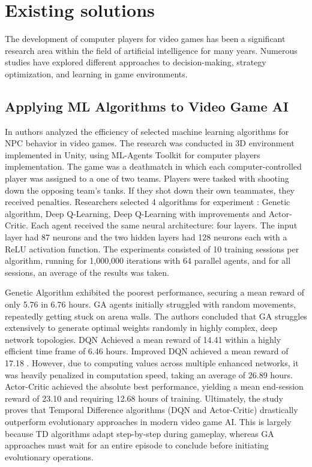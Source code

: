 \section{Existing solutions}
The development of computer players for video games has been a significant research area within the field of artificial intelligence for many years. Numerous studies have explored different approaches to decision-making, strategy optimization, and learning in game environments. 

\subsection{Applying ML Algorithms to Video Game AI}
In \cite{kopel2019applying} authors analyzed the efficiency of selected machine learning algorithms for NPC behavior in video games. The research was conducted in 3D environment implemented in Unity, using ML-Agents Toolkit for computer players implementation. The game was a deathmatch in which each computer-controlled player was assigned to a one of two teams. Players were tasked with shooting down the opposing team’s tanks. If they shot down their own teammates, they received penalties. Researchers selected 4 algorithms for experiment : Genetic algorithm, Deep Q-Learning, Deep Q-Learning with improvements and Actor-Critic. Each agent received the same neural architecture: four layers. The input layer had 87 neurons and the two hidden layers had 128 neurons each with a ReLU activation function. The experiments consisted of 10 training sessions per algorithm, running for 1,000,000 iterations with 64 parallel agents, and for all sessions, an average of the results was taken.

Genetic Algorithm exhibited the poorest performance, securing a mean reward of only 5.76 in 6.76 hours. GA agents initially struggled with random movements, repeatedly getting stuck on arena walls. The authors concluded that GA struggles extensively to generate optimal weights randomly in highly complex, deep network topologies. DQN Achieved a mean reward of 14.41 within a highly efficient time frame of 6.46 hours. Improved DQN achieved a mean reward of 17.18 . However, due to computing values across multiple enhanced networks, it was heavily penalized in computation speed, taking an average of 26.89 hours. Actor-Critic achieved the absolute best performance, yielding a mean end-session reward of 23.10 and requiring 12.68 hours of training. Ultimately, the study proves that Temporal Difference algorithms (DQN and Actor-Critic) drastically outperform evolutionary approaches in modern video game AI. This is largely because TD algorithms adapt step-by-step during gameplay, whereas GA approaches must wait for an entire episode to conclude before initiating evolutionary operations.

